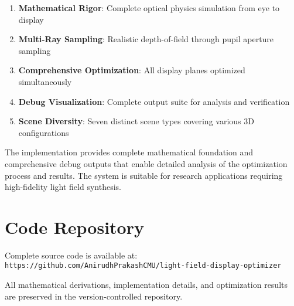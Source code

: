 \documentclass[12pt,a4paper]{article}
\begin{document}
\begin{enumerate}
    \item \textbf{Mathematical Rigor}: Complete optical physics simulation from eye to display
    \item \textbf{Multi-Ray Sampling}: Realistic depth-of-field through pupil aperture sampling  
    \item \textbf{Comprehensive Optimization}: All display planes optimized simultaneously
    \item \textbf{Debug Visualization}: Complete output suite for analysis and verification
    \item \textbf{Scene Diversity}: Seven distinct scene types covering various 3D configurations
\end{enumerate}

The implementation provides complete mathematical foundation and comprehensive debug outputs that enable detailed analysis of the optimization process and results. The system is suitable for research applications requiring high-fidelity light field synthesis.

\section{Code Repository}

Complete source code is available at:\\
\texttt{https://github.com/AnirudhPrakashCMU/light-field-display-optimizer}

All mathematical derivations, implementation details, and optimization results are preserved in the version-controlled repository.
\end{document}
